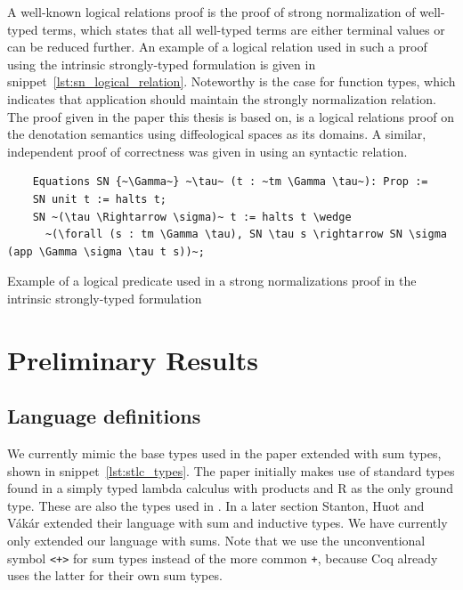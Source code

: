 \documentclass[12pt, final]{article}
\def\Vakar{V\'{a}k\'{a}r}
\begin{document}
A well-known logical relations proof is the proof of strong normalization of well-typed terms, which states that all well-typed terms are either terminal values or can be reduced further.
An example of a logical relation used in such a proof using the intrinsic strongly-typed formulation is given in snippet~\ref{lst:sn_logical_relation}.
Noteworthy is the case for function types, which indicates that application should maintain the strongly normalization relation.
The proof given in the paper this thesis is based on, is a logical relations proof on the denotation semantics using diffeological spaces as its domains\cite{huot2020correctness}.
A similar, independent proof of correctness was given in \cite{barthe2020versatility} using an syntactic relation.

\begin{listing}
  \begin{verbatim}
    Equations SN {~\Gamma~} ~\tau~ (t : ~tm \Gamma \tau~): Prop :=
    SN unit t := halts t;
    SN ~(\tau \Rightarrow \sigma)~ t := halts t \wedge
      ~(\forall (s : tm \Gamma \tau), SN \tau s \rightarrow SN \sigma (app \Gamma \sigma \tau t s))~;
  \end{verbatim}
  \caption{Example of a logical predicate used in a strong normalizations proof in the intrinsic strongly-typed formulation}
  \label{lst:sn_logical_relation}
\end{listing}

\section{Preliminary Results}

\subsection{Language definitions}

We currently mimic the base types used in the paper\cite{huot2020correctness} extended with sum types, shown in snippet~\ref{lst:stlc_types}. The paper initially makes use of standard types found in a simply typed lambda calculus with products and R as the only ground type. These are also the types used in \cite{barthe2020versatility}. In a later section Stanton, Huot and \Vakar{} extended their language with sum and inductive types. We have currently only extended our language with sums. Note that we use the unconventional symbol \texttt{<+>} for sum types instead of the more common \texttt{+}, because Coq already uses the latter for their own sum types.
\end{document}
